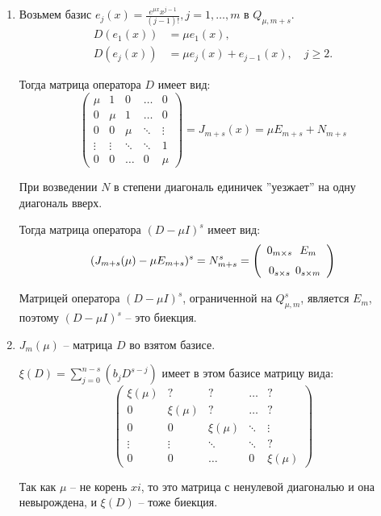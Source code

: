\begin{enumerate}
    \item Возьмем базис $e_j(x) = \frac{e^{\mu x} x^{j-1}}{(j-1)!}, j=1, \dots, m $ в $Q_{\mu, m+s}$.
    \begin{align*}
        D(e_1(x)) &= \mu e_1(x),\\
        D(e_j(x)) &= \mu e_j(x) + e_{j-1}(x), \quad j \geq 2.
    \end{align*}

    Тогда матрица оператора $D$ имеет вид:
    \begin{equation*}
        \begin{pmatrix}
            \mu & 1   & 0   & \dots & 0 \\
            0   & \mu & 1   & \dots & 0 \\
            0   & 0   & \mu & \ddots & \vdots \\
            \vdots & \vdots & \ddots & \ddots & 1 \\
            0   & 0   & \dots & 0 & \mu
        \end{pmatrix}
        = J_{m+s}(x) = \mu E_{m+s} + N_{m+s}
    \end{equation*}

    При возведении $N$ в степени диагональ единичек ''уезжает'' на одну диагональ вверх.

    Тогда матрица оператора $(D - \mu I)^s$ имеет вид:
    \begin{equation*}
        (J_{m+s}(\mu) - \mu E_{m+s})^s = N_{m+s}^s =
        \left(
            \begin{array}{c@{\;}c}
                0_{m\times s} & E_m \\[6pt]
                0_{s\times s} & 0_{s\times m}
            \end{array}
        \right)
    \end{equation*}

    Матрицей оператора $(D-\mu I)^s$, ограниченной на $Q_{\mu, m}^s$, является $E_m$, поэтому $(D-\mu I)^s$ -- это биекция.

    \item $J_m(\mu)$ -- матрица $D$ во взятом базисе.

    $\xi(D)=\sum_{j=0}^{n-s}(b_j D^{s-j})$ имеет в этом базисе матрицу вида:
    \begin{equation*}
        \begin{pmatrix}
            \xi(\mu) & ? & ?  & \dots & ? \\
            0   & \xi(\mu) & ?   & \dots & ? \\
            0   & 0   & \xi(\mu) & \ddots & \vdots \\
            \vdots & \vdots & \ddots & \ddots & ? \\
            0   & 0   & \dots & 0 & \xi(\mu)
        \end{pmatrix}
    \end{equation*}

    Так как $\mu$ -- не корень $xi$, то это матрица с ненулевой диагональю и она невырождена, и $\xi(D)$ -- тоже биекция.
\end{enumerate}

\Endproof
